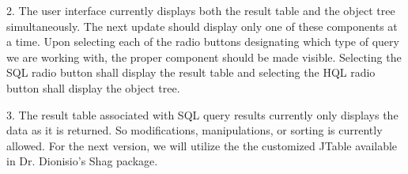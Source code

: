 2. The user interface currently displays both the result table and the object tree simultaneously. The next update should display only one of these components at a time. Upon selecting each of the radio buttons designating which type of query we are working with, the proper component should be made visible. Selecting the SQL radio button shall display the result table and selecting the HQL radio button shall display the object tree.

3. The result table associated with SQL query results currently only displays
the data as it is returned. So modifications, manipulations, or sorting is
currently allowed. For the next version, we will utilize the the customized
JTable available in Dr. Dionisio's Shag package.
